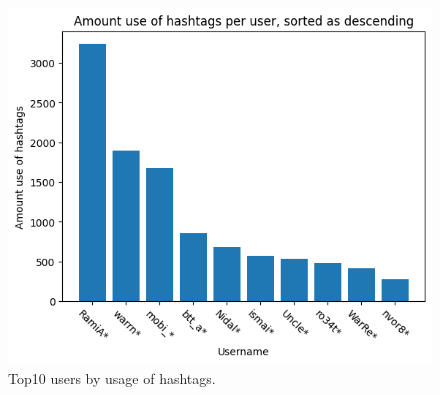 \documentclass[conference]{IEEEtran}
\begin{document}
    \begin{figure}
        \includegraphics[scale=0.6]{figures/amount_hashtags_user}
        \caption{Top10 users by usage of hashtags.}
        \label{fig:amount-hashtags-user}
    \end{figure}
\end{document}
